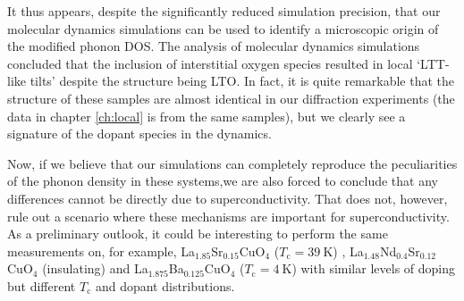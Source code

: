 It thus appears, despite the significantly reduced simulation precision, that our molecular dynamics simulations can be used to identify a microscopic origin of the modified phonon DOS. The analysis of molecular dynamics simulations concluded that the inclusion of interstitial oxygen species resulted in local `LTT-like tilts' despite the structure being LTO. In fact, it is quite remarkable that the structure of these samples are almost identical in our diffraction experiments (the data in chapter \ref{ch:local} is from the same samples), but we clearly see a signature of the dopant species in the dynamics. 

Now, if we believe that our simulations can completely reproduce the peculiarities of the phonon density in these systems,we are also forced to conclude that any differences cannot be directly due to superconductivity. That does not, however, rule out a scenario where these mechanisms are important for superconductivity. As a preliminary outlook, it could be interesting to perform the same measurements on, for example, La$_{1.85}$Sr$_{0.15}$CuO$_4$ ($T_\text{c} = \SI{39}{\kelvin}$) \cite{Radaelli1994a}, La$_{1.48}$Nd$_{0.4}$Sr$_{0.12}$CuO$_4$ (insulating) \cite{Tranquada1995} and La$_{1.875}$Ba$_{0.125}$CuO$_4$ ($T_\text{c} = \SI{4}{\kelvin}$) \cite{Hucker2011} with similar levels of doping but different $T_\text{c}$ and dopant distributions.
